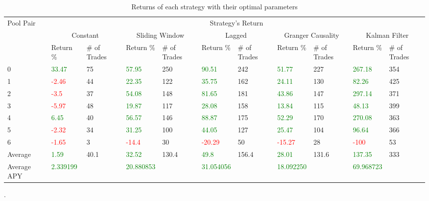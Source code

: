 \begin{table}[!htb]
    \centering
    \begin{adjustwidth}{-0.8in}{-0.9in}
        \begin{tabular}{|p{4em}|p{3em}|p{3em}|p{3em}|p{3em}|p{3em}|p{3em}|p{3em}|p{3em}|p{3em}|p{3em}|}\hline
            Pool Pair & \multicolumn{10}{|c|}{Strategy's Return} \\\cline{2-11}
            & \multicolumn{2}{|c|}{Constant} & \multicolumn{2}{|c|}{Sliding Window} & \multicolumn{2}{|c|}{Lagged} & \multicolumn{2}{|c|}{Granger Causality} & \multicolumn{2}{|c|}{Kalman Filter}\\\cline{2-11}
            & Return \% & \# of Trades & Return \% & \# of Trades & Return \% & \# of Trades & Return \% & \# of Trades & Return \% & \# of Trades\\\hline
            0 & \textcolor{green}{33.47} & 75 & \textcolor{green}{57.95} & 250 & \textcolor{green}{90.51} & 242 & \textcolor{green}{51.77} & 227 & \textcolor{green}{267.18} & 354\\\cline{2-11}
            1 & \textcolor{red}{-2.46} & 44 & \textcolor{green}{22.35} & 122 & \textcolor{green}{35.75} & 162 & \textcolor{green}{24.11} & 130 & \textcolor{green}{82.26} & 425\\\cline{2-11}
            2 & \textcolor{red}{-3.5} & 37 & \textcolor{green}{54.08} & 148 & \textcolor{green}{81.65} & 181 & \textcolor{green}{43.86} & 147 & \textcolor{green}{297.14} & 371\\\cline{2-11}
            3 & \textcolor{red}{-5.97} & 48 & \textcolor{green}{19.87} & 117 & \textcolor{green}{28.08} & 158 & \textcolor{green}{13.84} & 115 & \textcolor{green}{48.13} & 399\\\cline{2-11}
            4 & \textcolor{green}{6.45} & 40 & \textcolor{green}{56.57} & 146 & \textcolor{green}{88.87} & 175 & \textcolor{green}{52.29} & 170 & \textcolor{green}{270.08} & 363\\\cline{2-11}
            5 & \textcolor{red}{-2.32} & 34 & \textcolor{green}{31.25} & 100 & \textcolor{green}{44.05} & 127 & \textcolor{green}{25.47} & 104 & \textcolor{green}{96.64} & 366\\\cline{2-11}
            6 & \textcolor{red}{-1.65} & 3 & \textcolor{red}{-14.4} & 30 & \textcolor{red}{-20.29} & 50 & \textcolor{red}{-15.27} & 28 & \textcolor{red}{-100} & 53\\\hline\hline            
            Average & \textcolor{green}{1.59} & 40.1 & \textcolor{green}{32.52} & 130.4 & \textcolor{green}{49.8} & 156.4 & \textcolor{green}{28.01} & 131.6 & \textcolor{green}{137.35} & 333\\\hline            
            Average APY & \textcolor{green}{2.339199} &  & \textcolor{green}{20.880853} &   & \textcolor{green}{31.054056} &  & \textcolor{green}{18.092250} &  & \textcolor{green}{69.968723} & \\\hline            
        \end{tabular}
    \end{adjustwidth}
    \caption{Returns of each strategy with their optimal parameters \label{tab:FinalResults}}.
\end{table}

